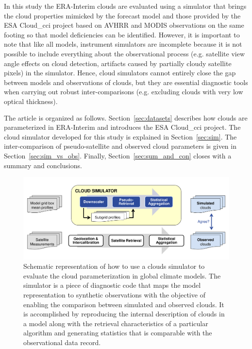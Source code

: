 In this study the ERA-Interim clouds are evaluated using a simulator that brings
the cloud properties mimicked by the forecast model and those provided by the 
ESA Cloud\_cci project based on AVHRR and MODIS observations on the same footing 
so that model deficiencies can be identified.
However, it is important to note that like all models, instrument simulators are incomplete
because it is not possible to include everything about the observational process 
(e.g. satellite view angle effects on cloud detection, 
artifacts caused by partially cloudy satellite pixels) in the simulator.
Hence, cloud simulators cannot entirely close the gap between models and observations of clouds,
but they are essential diagnostic tools when carrying out robust inter-comparisons
(e.g. excluding clouds with very low optical thickness).

The article is organized as follows. Section~\ref{sec:datasets} describes how clouds 
are parameterized in ERA-Interim and introduces the ESA Cloud\_cci project.
The cloud simulator developed for this study is explained in Section~\ref{sec:sim}.
The inter-comparison of pseudo-satellite and observed cloud parameters is given in Section~\ref{sec:sim_vs_obs}.
Finally, Section~\ref{sec:sum_and_con} closes with a summary and conclusions. 

\begin{figure}[!t]
 \centering
 \includegraphics[width=\textwidth]{./figures/simulator_overview.png}
 \caption[Simulator evaluation concept.]
 {Schematic representation of how to use a clouds simulator to evaluate the
 cloud parameterization in global climate models. The simulator is a piece of 
 diagnostic code that maps the model representation to synthetic observations 
 with the objective of enabling the comparison between simulated and observed clouds.
 It is accomplished by reproducing the internal description of clouds in a model 
 along with the retrieval characteristics of a particular algorithm and generating
 statistics that is comparable with the observational data record.}\label{fig:sim_over}
\end{figure}
